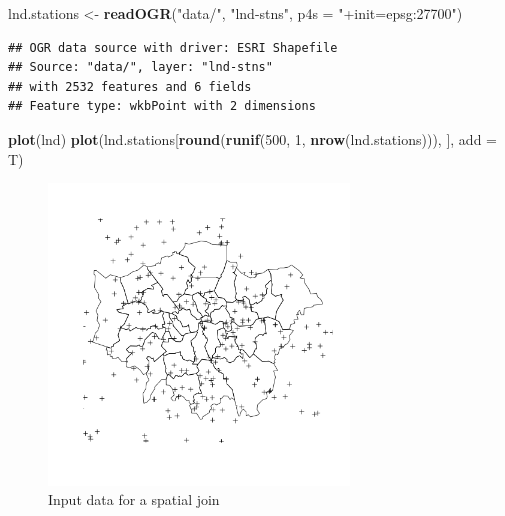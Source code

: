 \documentclass[]{article}
\newenvironment{Shaded}{}{}
\newcommand{\KeywordTok}[1]{\textcolor[rgb]{0.00,0.44,0.13}{\textbf{{#1}}}}
\newcommand{\DataTypeTok}[1]{\textcolor[rgb]{0.56,0.13,0.00}{{#1}}}
\newcommand{\DecValTok}[1]{\textcolor[rgb]{0.25,0.63,0.44}{{#1}}}
\newcommand{\StringTok}[1]{\textcolor[rgb]{0.25,0.44,0.63}{{#1}}}
\newcommand{\NormalTok}[1]{{#1}}
\let\Oldincludegraphics\includegraphics
\renewcommand{\includegraphics}[1]{\Oldincludegraphics[width=8cm]{#1}}
\begin{document}
\begin{Shaded}
\begin{Highlighting}[]
\NormalTok{lnd.stations <- }\KeywordTok{readOGR}\NormalTok{(}\StringTok{"data/"}\NormalTok{, }\StringTok{"lnd-stns"}\NormalTok{, }\DataTypeTok{p4s =} \StringTok{"+init=epsg:27700"}\NormalTok{)}
\end{Highlighting}
\end{Shaded}
\begin{verbatim}
## OGR data source with driver: ESRI Shapefile 
## Source: "data/", layer: "lnd-stns"
## with 2532 features and 6 fields
## Feature type: wkbPoint with 2 dimensions
\end{verbatim}
\begin{Shaded}
\begin{Highlighting}[]
\KeywordTok{plot}\NormalTok{(lnd)}
\KeywordTok{plot}\NormalTok{(lnd.stations[}\KeywordTok{round}\NormalTok{(}\KeywordTok{runif}\NormalTok{(}\DecValTok{500}\NormalTok{, }\DecValTok{1}\NormalTok{, }\KeywordTok{nrow}\NormalTok{(lnd.stations))), ], }\DataTypeTok{add =} \NormalTok{T)}
\end{Highlighting}
\end{Shaded}
\begin{figure}[htbp]
\centering
\includegraphics{figure/Input_data_for_a_spatial_join.png}
\caption{Input data for a spatial join}
\end{figure}
\end{document}
